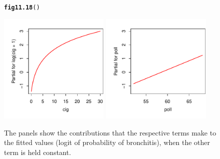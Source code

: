 \documentclass[12pt, a4paper,  BCOR=8.25mm, DIV=15]{scrartcl}\usepackage[]{graphicx}\usepackage[]{color}
\makeatletter
\newcommand{\hlstd}[1]{\textcolor[rgb]{0.345,0.345,0.345}{#1}}%
\newcommand{\hlkwd}[1]{\textcolor[rgb]{0.737,0.353,0.396}{\textbf{#1}}}%
\newenvironment{kframe}{%
 \def\at@end@of@kframe{}%
 \ifinner\ifhmode%
  \def\at@end@of@kframe{\end{minipage}}%
  \begin{minipage}{\columnwidth}%
 \fi\fi%
 \def\FrameCommand##1{\hskip\@totalleftmargin \hskip-\fboxsep
 \colorbox{shadecolor}{##1}\hskip-\fboxsep
     \hskip-\linewidth \hskip-\@totalleftmargin \hskip\columnwidth}%
 \MakeFramed {\advance\hsize-\width
   \@totalleftmargin\z@ \linewidth\hsize
   \@setminipage}}%
 {\par\unskip\endMakeFramed%
 \at@end@of@kframe}
\newenvironment{knitrout}{}{} %
\makeatother
\begin{document}
\begin{figure}[H]
\begin{knitrout}
\color{fgcolor}\begin{kframe}
\begin{alltt}
\hlkwd{fig11.18}\hlstd{()}
\end{alltt}
\end{kframe}

{\centering \includegraphics[width=0.47\textwidth]{figs/reg-cig2-tplot-11_18-1} 
\includegraphics[width=0.47\textwidth]{figs/reg-cig2-tplot-11_18-2} 

}



\end{knitrout}
\caption{The panels show the contributions that the respective terms
  make to the fitted values (logit of probability of bronchitis), when
  the other term is held constant.\label{fig:xy-cig}}
\end{figure}
\end{document}
